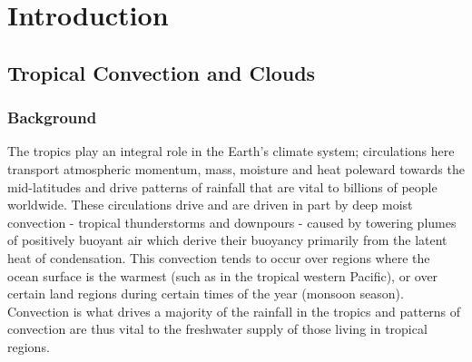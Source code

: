 \documentclass[letterpaper,12pt,titlepage,oneside,final]{book}
\begin{document}
 

\chapter{Introduction}\label{intro}
\section{Tropical Convection and Clouds}
\subsection{Background}\label{background}
The tropics play an integral role in the Earth's climate system; circulations here transport atmospheric momentum, mass, moisture and heat poleward towards the mid-latitudes and drive patterns of rainfall that are vital to billions of people worldwide. These circulations drive and are driven in part by deep moist convection - tropical thunderstorms and downpours - caused by towering plumes of positively buoyant air which derive their buoyancy primarily from the latent heat of condensation. This convection tends to occur over regions where the ocean surface is the warmest (such as in the tropical western Pacific), or over certain land regions during certain times of the year (monsoon season). Convection is what drives a majority of the rainfall in the tropics and patterns of convection are thus vital to the freshwater supply of those living in tropical regions.
\end{document}

